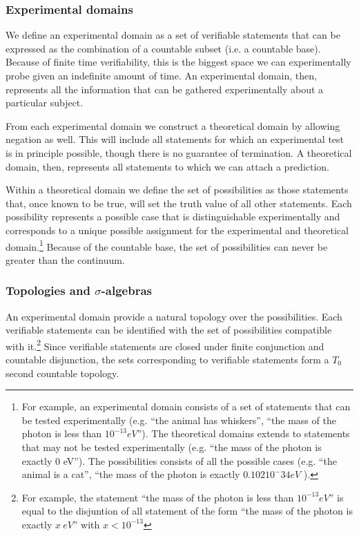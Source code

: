 \documentclass[twocolumn]{article}
\begin{document}
\subsubsection{Experimental domains}

We define an experimental domain as a set of verifiable statements that can be expressed as the combination of a countable subset (i.e. a countable base). Because of finite time verifiability, this is the biggest space we can experimentally probe given an indefinite amount of time. An experimental domain, then, represents all the information that can be gathered experimentally about a particular subject.

From each experimental domain we construct a theoretical domain by allowing negation as well. This will include all statements for which an experimental test is in principle possible, though there is no guarantee of termination. A theoretical domain, then, represents all statements to which we can attach a prediction.

Within a theoretical domain we define the set of possibilities as those statements that, once known to be true, will set the truth value of all other statements. Each possibility represents a possible case that is distinguishable experimentally and corresponds to a unique possible assignment for the experimental and theoretical domain.\footnote{For example, an experimental domain consists of a set of statements that can be tested experimentally (e.g. ``the animal has whiskers'', ``the mass of the photon is less than $10^{-13} eV$''). The theoretical domains extends to statements that may not be tested experimentally (e.g. ``the mass of the photon is exactly 0 eV''). The possibilities consists of all the possible cases (e.g. ``the animal is a cat'', ``the mass of the photon is exactly $0.102 10^-{34} eV$ ).} Because of the countable base, the set of possibilities can never be greater than the continuum.


\subsubsection{Topologies and $\sigma$-algebras}

An experimental domain provide a natural topology over the possibilities. Each verifiable statements can be identified with the set of possibilities compatible with it.\footnote{For example, the statement ``the mass of the photon is less than $10^{-13} eV$'' is equal to the disjuntion of all statement of the form ``the mass of the photon is exactly $x~eV$'' with $x <  10^{-13}$} Since verifiable statements are closed under finite conjunction and countable disjunction, the sets corresponding to verifiable statements form a $T_0$ second countable topology.
\end{document}
